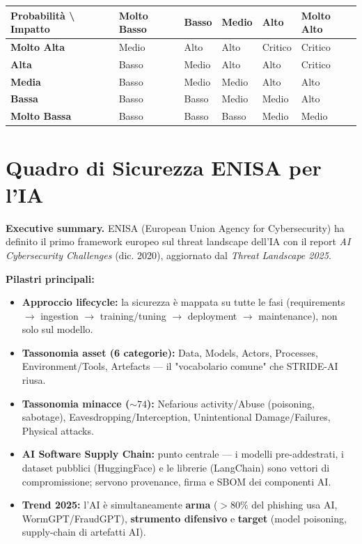 \documentclass[11pt, a4paper]{article}
\begin{document}
\noindent
\begin{tabularx}{\textwidth}{|>{\bfseries}l|X|X|X|X|X|}
\hline
Probabilità \textbackslash{} Impatto & \textbf{Molto Basso} & \textbf{Basso} & \textbf{Medio} & \textbf{Alto} & \textbf{Molto Alto} \\ \hline
Molto Alta & Medio & Alto & Alto & Critico & Critico \\ \hline
Alta & Basso & Medio & Alto & Alto & Critico \\ \hline
Media & Basso & Medio & Medio & Alto & Alto \\ \hline
Bassa & Basso & Basso & Medio & Medio & Alto \\ \hline
Molto Bassa & Basso & Basso & Basso & Medio & Medio \\ \hline
\end{tabularx}

\section{Quadro di Sicurezza ENISA per l'IA}

\textbf{Executive summary.} ENISA (European Union Agency for Cybersecurity) ha definito il primo framework europeo sul threat landscape dell'IA con il report \emph{AI Cybersecurity Challenges} (dic. 2020), aggiornato dal \emph{Threat Landscape 2025}.

\textbf{Pilastri principali:}
\begin{itemize}[leftmargin=*]
    \item \textbf{Approccio lifecycle:} la sicurezza è mappata su tutte le fasi (requirements $\rightarrow$ ingestion $\rightarrow$ training/tuning $\rightarrow$ deployment $\rightarrow$ maintenance), non solo sul modello.
    \item \textbf{Tassonomia asset (6 categorie):} Data, Models, Actors, Processes, Environment/Tools, Artefacts — il "vocabolario comune" che STRIDE-AI riusa.
    \item \textbf{Tassonomia minacce ($\sim 74$):} Nefarious activity/Abuse (poisoning, sabotage), Eavesdropping/Interception, Unintentional Damage/Failures, Physical attacks.
    \item \textbf{AI Software Supply Chain:} punto centrale — i modelli pre-addestrati, i dataset pubblici (HuggingFace) e le librerie (LangChain) sono vettori di compromissione; servono provenance, firma e SBOM dei componenti AI.
    \item \textbf{Trend 2025:} l'AI è simultaneamente \textbf{arma} ($>80\%$ del phishing usa AI, WormGPT/FraudGPT), \textbf{strumento difensivo} e \textbf{target} (model poisoning, supply-chain di artefatti AI).
\end{itemize}
\end{document}
